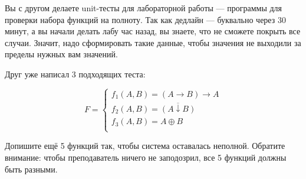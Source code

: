 \question
Вы с другом делаете unit-тесты для лабораторной работы — программы для проверки набора функций на полноту. Так как дедлайн — буквально через 30 минут, а вы начали делать лабу час назад, вы знаете, что не сможете покрыть все случаи. Значит, надо сформировать такие данные, чтобы значения не выходили за пределы нужных вам значений.

Друг уже написал 3 подходящих теста:

\begin{equation*}
    F=
    \begin{cases}
        f_1(A,B)=(A \rightarrow B) \rightarrow A\\
        f_2(A,B)=\overline{(A \downarrow B)}\\
        f_3(A,B)=A \oplus B\\
    \end{cases}
\end{equation*}
    
Допишите ещё 5 функций так, чтобы система оставалась неполной. Обратите внимание: чтобы преподаватель ничего не заподозрил, все 5 функций должны быть разными.